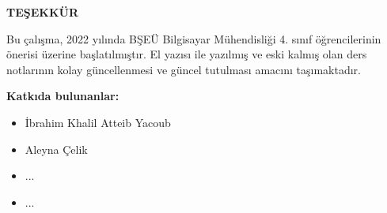 
\begin{center}
    \textbf{TEŞEKKÜR}
\end{center}
Bu çalışma, 2022 yılında BŞEÜ Bilgisayar Mühendisliği 4. sınıf öğrencilerinin önerisi üzerine başlatılmıştır. El yazısı ile yazılmış ve eski kalmış olan ders notlarının kolay güncellenmesi ve güncel tutulması amacını taşımaktadır.

\textbf{Katkıda bulunanlar:}
\begin{itemize}
    \item İbrahim Khalil Atteib Yacoub
    \item Aleyna Çelik
    \item ...
    \item ...
\end{itemize}